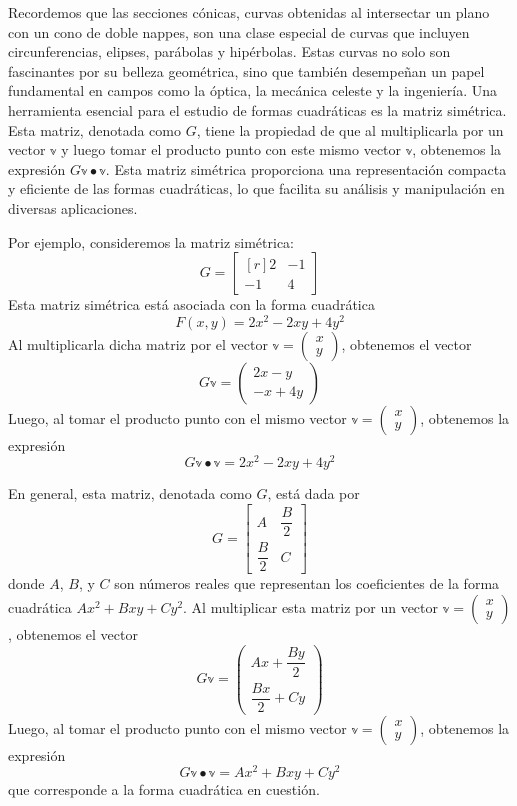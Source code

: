 Recordemos que las secciones cónicas, curvas obtenidas al intersectar un plano con un cono de doble nappes, son una clase especial de curvas que incluyen circunferencias, elipses, parábolas y hipérbolas. Estas curvas no solo son fascinantes por su belleza geométrica, sino que también desempeñan un papel fundamental en campos como la óptica, la mecánica celeste y la ingeniería. Una herramienta esencial para el estudio de formas cuadráticas es la matriz simétrica. Esta matriz, denotada como $G$, tiene la propiedad de que al multiplicarla por un vector $\mathbb{v}$ y luego tomar el producto punto con este mismo vector $\mathbb{v}$, obtenemos la expresión $G\mathbb{v} \bullet \mathbb{v}$. Esta matriz simétrica proporciona una representación compacta y eficiente de las formas cuadráticas, lo que facilita su análisis y manipulación en diversas aplicaciones.

Por ejemplo, consideremos la matriz simétrica:
$$G = \begin{bmatrix*}[r] 2 & -1 \\ -1 & 4 \end{bmatrix*}$$
Esta matriz simétrica está asociada con la forma cuadrática
$$F(x, y) = 2x^2 - 2xy + 4y^2$$
Al multiplicarla dicha matriz por el vector $\mathbb{v} = \begin{pmatrix} x \\ y \end{pmatrix}$, obtenemos el vector
$$G\mathbb{v} = \begin{pmatrix} 2x - y \\ -x + 4y \end{pmatrix}$$
Luego, al tomar el producto punto con el mismo vector $\mathbb{v} = \begin{pmatrix} x \\ y \end{pmatrix}$, obtenemos la expresión
$$G\mathbb{v} \bullet \mathbb{v} = 2x^2 - 2xy + 4y^2$$

En general, esta matriz, denotada como $G$, está dada por
$$G = \begin{bmatrix} A & \dfrac{B}{2} \\[2mm] \dfrac{B}{2} & C \end{bmatrix}$$
donde $A$, $B$, y $C$ son números reales que representan los coeficientes de la forma cuadrática $Ax^2 + Bxy + Cy^2$. Al multiplicar esta matriz por un vector $\mathbb{v} = \begin{pmatrix} x \\ y \end{pmatrix}$, obtenemos el vector
$$G\mathbb{v} = \begin{pmatrix} Ax + \dfrac{By}{2} \\[2mm] \dfrac{Bx}{2} + Cy \end{pmatrix}$$
Luego, al tomar el producto punto con el mismo vector $\mathbb{v} = \begin{pmatrix} x \\ y \end{pmatrix}$, obtenemos la expresión
$$G\mathbb{v} \bullet \mathbb{v} = Ax^2 + Bxy + Cy^2$$
que corresponde a la forma cuadrática en cuestión.


